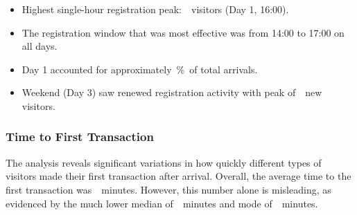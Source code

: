 \begin{keytakeaways}
	\begin{itemize}
		\item Highest single-hour registration peak:~~visitors (Day 1, 16:00).
		\item The registration window that was most effective was from 14:00 to 17:00 on all days.
		\item Day 1 accounted for approximately~\%~of total arrivals.
		\item Weekend (Day 3) saw renewed registration activity with peak of~~new visitors.
	\end{itemize}
\end{keytakeaways}


\subsubsection{Time to First Transaction}
\label{subsubsec:analysis-first-transaction}


The analysis reveals significant variations in how quickly different types of visitors made their first transaction after arrival.
Overall, the average time to the first transaction was~~minutes.
However, this number alone is misleading, as evidenced by the much lower median of~~minutes and mode of~~minutes.

